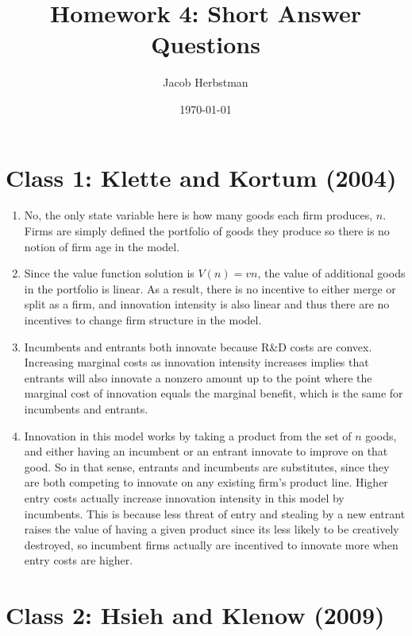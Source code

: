 \documentclass{article}
\title{Homework 4: Short Answer Questions}
\author{Jacob Herbstman}
\date{\today}
\begin{document}
\maketitle

\section*{Class 1: Klette and Kortum (2004)}

\begin{enumerate}
    \item No, the only state variable here is how many goods each firm produces, $n$. 
    Firms are simply defined the portfolio of goods they produce so there is no notion of firm age in the model.

    \item Since the value function solution is $V(n) = vn$, the value of additional goods in the portfolio is linear. 
    As a result, there is no incentive to either merge or split as a firm, and innovation intensity is also linear and thus there are no incentives to change firm structure in the model.

    \item Incumbents and entrants both innovate because R\&D costs are convex. 
    Increasing marginal costs as innovation intensity increases implies that entrants will also innovate a nonzero amount up to the point where the marginal cost of innovation equals the marginal benefit, which is the same for incumbents and entrants. 

    \item Innovation in this model works by taking a product from the set of $n$ goods, and either having an incumbent or an entrant innovate to improve on that good.
    So in that sense, entrants and incumbents are substitutes, since they are both competing to innovate on any existing firm's product line.
    Higher entry costs actually increase innovation intensity in this model by incumbents. 
    This is because less threat of entry and stealing by a new entrant raises the value of having a given product since its less likely to be creatively destroyed, 
    so incumbent firms actually are incentived to innovate more when entry costs are higher.

\end{enumerate}

\section*{Class 2: Hsieh and Klenow (2009)}
\end{document}
